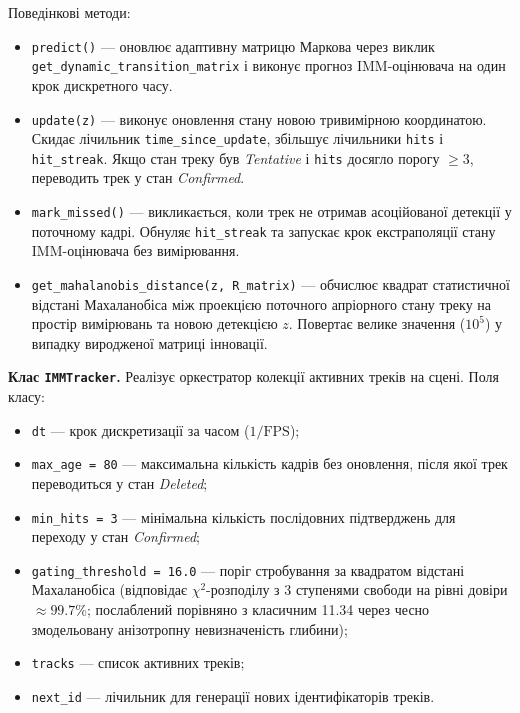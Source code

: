 Поведінкові методи:
\begin{itemize}
    \item \texttt{predict()} --- оновлює адаптивну матрицю Маркова через виклик
    \texttt{get\_dynamic\_transition\_matrix} і виконує прогноз \gls{IMM}-оцінювача
    на один крок дискретного часу.
    \item \texttt{update(z)} --- виконує оновлення стану новою тривимірною
    координатою. Скидає лічильник \texttt{time\_since\_update}, збільшує
    лічильники \texttt{hits} і \texttt{hit\_streak}. Якщо стан треку був
    \textit{Tentative} і \texttt{hits} досягло порогу $\geq 3$, переводить трек у
    стан \textit{Confirmed}.
    \item \texttt{mark\_missed()} --- викликається, коли трек не отримав асоційованої
    детекції у поточному кадрі. Обнуляє \texttt{hit\_streak} та запускає крок
    екстраполяції стану \gls{IMM}-оцінювача без вимірювання.
    \item \texttt{get\_mahalanobis\_distance(z, R\_matrix)} --- обчислює квадрат
    статистичної відстані Махаланобіса між проекцією поточного апріорного стану
    треку на простір вимірювань та новою детекцією $z$. Повертає велике значення
    ($10^5$) у випадку виродженої матриці інновації.
\end{itemize}

\textbf{Клас \texttt{IMMTracker}.} Реалізує оркестратор колекції активних треків на
сцені. Поля класу:
\begin{itemize}
    \item \texttt{dt} --- крок дискретизації за часом ($1/\text{FPS}$);
    \item \texttt{max\_age = 80} --- максимальна кількість кадрів без оновлення, після
    якої трек переводиться у стан \textit{Deleted};
    \item \texttt{min\_hits = 3} --- мінімальна кількість послідовних підтверджень
    для переходу у стан \textit{Confirmed};
    \item \texttt{gating\_threshold = 16.0} --- поріг стробування за квадратом
    відстані Махаланобіса (відповідає $\chi^2$-розподілу з 3 ступенями свободи на
    рівні довіри $\approx 99.7\%$; послаблений порівняно з класичним 11.34 через
    чесно змодельовану анізотропну невизначеність глибини);
    \item \texttt{tracks} --- список активних треків;
    \item \texttt{next\_id} --- лічильник для генерації нових ідентифікаторів треків.
\end{itemize}

